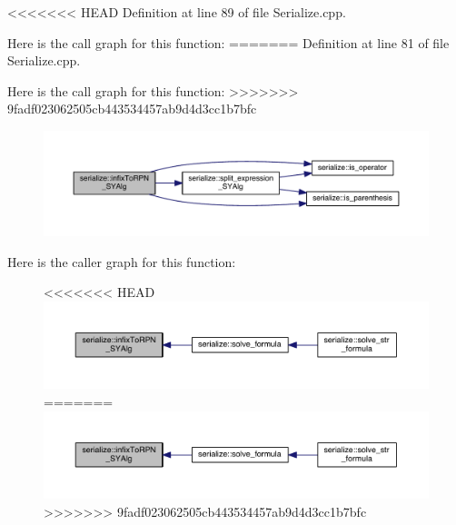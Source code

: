 <<<<<<< HEAD
Definition at line 89 of file Serialize.\+cpp.



Here is the call graph for this function\+:\nopagebreak
=======
Definition at line 81 of file Serialize.\+cpp.



Here is the call graph for this function\+:
\nopagebreak
>>>>>>> 9fadf023062505cb443534457ab9d4d3cc1b7bfc
\begin{figure}[H]
\begin{center}
\leavevmode
\includegraphics[width=350pt]{namespaceserialize_a2876e5d84edeaa969e25a176eb582bb3_cgraph}
\end{center}
\end{figure}




Here is the caller graph for this function\+:
\nopagebreak
\begin{figure}[H]
\begin{center}
\leavevmode
<<<<<<< HEAD
\includegraphics[width=350pt]{namespaceserialize_a2876e5d84edeaa969e25a176eb582bb3_icgraph}
=======
\includegraphics[width=348pt]{namespaceserialize_a2876e5d84edeaa969e25a176eb582bb3_icgraph}
>>>>>>> 9fadf023062505cb443534457ab9d4d3cc1b7bfc
\end{center}
\end{figure}


\hypertarget{namespaceserialize_a897be0f6c9fe37021e11bfeb732d3500}{}
